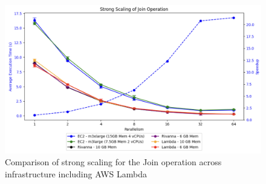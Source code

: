 \begin{figure}[ht]
    \begin{center}
    \includegraphics[width=\linewidth]{source/Figure/strongscalinground3.png}
    \end{center}
    \caption{Comparison of strong scaling for the Join operation across infrastructure including AWS Lambda}
    \label{fig:strongscalinground3}
\end{figure}